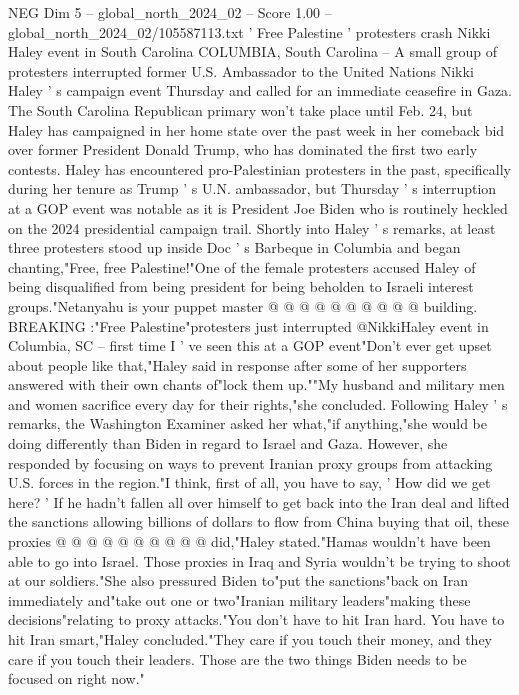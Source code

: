 \begin{textsample}{NEG Dim 5 – global\_north\_2024\_02 – Score 1.00 – global\_north\_2024\_02/105587113.txt}  \label{ex:f5_neg_216}
' Free Palestine ' protesters crash Nikki Haley event in South Carolina COLUMBIA, South Carolina -- A small group of protesters interrupted former U.S.
Ambassador to the United Nations Nikki Haley ' s campaign event Thursday and called for an immediate ceasefire in Gaza.
The South Carolina Republican primary won't take place until Feb. 24, but Haley has campaigned in her home state over the past week in her comeback bid over former President Donald Trump, who has dominated the first two early contests.
Haley has encountered pro-Palestinian protesters in the past, specifically during her tenure as Trump ' s U.N. ambassador, but Thursday ' s interruption at a GOP event was notable as it is President Joe Biden who is routinely heckled on the 2024 presidential campaign trail.
Shortly into Haley ' s remarks, at least three protesters stood up inside Doc ' s Barbeque in Columbia and began chanting,"Free, free Palestine!"One of the female protesters accused Haley of being disqualified from being president for being beholden to Israeli interest groups."Netanyahu is your puppet master @ @ @ @ @ @ @ @ @ @ building.
BREAKING :"Free Palestine"protesters just interrupted @NikkiHaley event in Columbia, SC -- first time I ' ve seen this at a GOP event"Don't ever get upset about people like that,"Haley said in response after some of her supporters answered with their own chants of"lock them up.""My husband and military men and women sacrifice every day for their rights,"she concluded.
Following Haley ' s remarks, the Washington Examiner asked her what,"if anything,"she would be doing differently than Biden in regard to Israel and Gaza.
However, she responded by focusing on ways to prevent Iranian proxy groups from attacking U.S. forces in the region."I think, first of all, you have to say, ' How did we get here? ' If he hadn't fallen all over himself to get back into the Iran deal and lifted the sanctions allowing billions of dollars to flow from China buying that oil, these proxies @ @ @ @ @ @ @ @ @ @ did,"Haley stated."Hamas wouldn't have been able to go into Israel.
Those proxies in Iraq and Syria wouldn't be trying to shoot at our soldiers."She also pressured Biden to"put the sanctions"back on Iran immediately and"take out one or two"Iranian military leaders"making these decisions"relating to proxy attacks."You don't have to hit Iran hard.
You have to hit Iran smart,"Haley concluded."They care if you touch their money, and they care if you touch their leaders.
Those are the two things Biden needs to be focused on right now."

\end{textsample}
